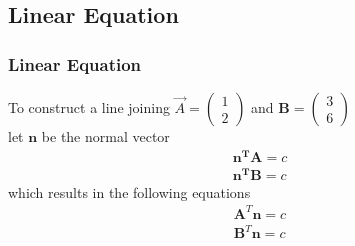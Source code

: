 \documentclass{beamer}
\providecommand{\brak}[1]{\ensuremath{\left(#1\right)}}
\theoremstyle{remark}
\providecommand{\norm}[1]{\lVert#1\rVert}
\newcommand{\myvec}[1]{\ensuremath{\begin{pmatrix}#1\end{pmatrix}}}
\let\vec\mathbf
\numberwithin{equation}{section}
\begin{document}
\subsection{Linear Equation}
\begin{frame}
\frametitle{Linear Equation}
To construct a line joining $\Vec{A}=\myvec{1\\2}$ and $\vec{B}=\myvec{3\\6}$ \\
let $\vec{n}$ be the normal vector
%
\begin{align}
\vec{n^T} \vec {A}=c \label{eq:1} \\
\vec{n^T} \vec {B}=c  \label{eq:2} 
\end{align}
%
which results in the following equations
%
\begin{align}
\vec{A}^T \vec {n}=c \\
\vec{B}^T \vec {n}=c  \\
\end{align}
\end{frame}
\end{document}
